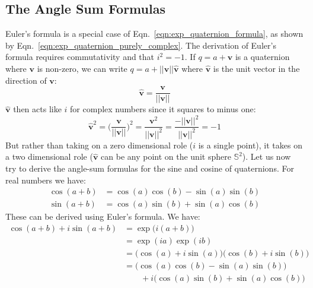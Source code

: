 \documentclass{article}
\theoremstyle{plain}
\theoremstyle{normal}
\begin{document}
        \subsection{The Angle Sum Formulas}
            Euler's formula is a special case of
            Eqn.~\ref{eqn:exp_quaternion_formula}, as shown by
            Eqn.~\ref{eqn:exp_quaternion_purely_complex}. The derivation of
            Euler's formula requires commutativity and that $i^{2}=-1$. If
            $q=a+\mathbf{v}$ is a quaternion where $\mathbf{v}$ is non-zero,
            we can write $q=a+||\mathbf{v}||\hat{\mathbf{v}}$ where
            $\hat{\mathbf{v}}$ is the unit vector in the direction of
            $\mathbf{v}$:
            \begin{equation}
                \hat{\mathbf{v}}=\frac{\mathbf{v}}{||\mathbf{v}||}
            \end{equation}
            $\hat{\mathbf{v}}$ then acts like $i$ for complex numbers since it
            squares to minus one:
            \begin{equation}
                \hat{\mathbf{v}}^{2}
                =\Big(\frac{\mathbf{v}}{||\mathbf{v}||}\Big)^{2}
                =\frac{\mathbf{v}^{2}}{||\mathbf{v}||^{2}}
                =\frac{-||\mathbf{v}||^{2}}{||\mathbf{v}||^{2}}
                =-1
            \end{equation}
            But rather than taking on a zero dimensional role
            ($i$ is a single point),
            it takes on a two dimensional role ($\hat{\mathbf{v}}$ can be
            any point on the unit sphere $\mathbb{S}^{2}$). Let us now try to
            derive the angle-sum formulas for the sine and cosine of
            quaternions. For real numbers we have:
            \begin{align}
                \label{eqn:angle_sum_formula_cos}
                \cos(a+b)&=\cos(a)\cos(b)-\sin(a)\sin(b)\\
                \label{eqn:angle_sum_formula_sin}
                \sin(a+b)&=\cos(a)\sin(b)+\sin(a)\cos(b)
            \end{align}
            These can be derived using Euler's formula. We have:
            \begin{align}
                \cos(a+b)+i\sin(a+b)
                &=\exp\big(i(a+b)\big)\\
                &=\exp(ia)\exp(ib)\\
                &=\Big(\cos(a)+i\sin(a)\Big)
                    \Big(\cos(b)+i\sin(b)\Big)\\
                &=\Big(\cos(a)\cos(b)-\sin(a)\sin(b)\Big)\nonumber\\
                &\hspace{2em}
                    +i\Big(\cos(a)\sin(b)+\sin(a)\cos(b)\Big)
            \end{align}
\end{document}
